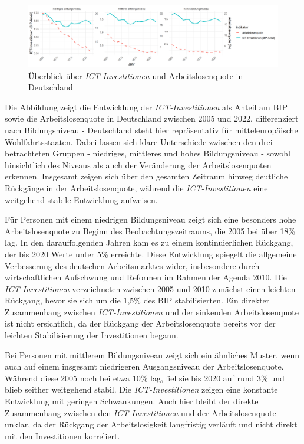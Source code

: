 \begin{figure}[htbp]
    \centering
    \includegraphics[width=\textwidth]{assets/plot_germany.png}
    \caption{Überblick über \textit{\ac{ICT}-Investitionen} und Arbeitslosenquote in 
    Deutschland}
    \label{fig:germany}
\end{figure}

Die Abbildung zeigt die Entwicklung der \textit{\ac{ICT}-Investitionen} als Anteil 
am BIP sowie die Arbeitslosenquote in Deutschland zwischen 2005 und 2022, 
differenziert nach Bildungsniveau - Deutschland steht hier repräsentativ für 
mitteleuropäische Wohlfahrtsstaaten. Dabei lassen sich klare Unterschiede zwischen 
den drei betrachteten Gruppen - niedriges, mittleres und hohes Bildungsniveau - sowohl 
hinsichtlich des Niveaus als auch der Veränderung der Arbeitslosenquoten erkennen. 
Insgesamt zeigen sich über den gesamten Zeitraum hinweg deutliche Rückgänge in der 
Arbeitslosenquote, während die \textit{\ac{ICT}-Investitionen} eine weitgehend 
stabile Entwicklung aufweisen.

Für Personen mit einem niedrigen Bildungsniveau zeigt sich eine besonders hohe 
Arbeitslosenquote zu Beginn des Beobachtungszeitraums, die 2005 bei über 18\% lag. 
In den darauffolgenden Jahren kam es zu einem kontinuierlichen Rückgang, der bis 2020 
Werte unter 5\% erreichte. Diese Entwicklung spiegelt die allgemeine Verbesserung des 
deutschen Arbeitsmarktes wider, insbesondere durch wirtschaftlichen Aufschwung und 
Reformen im Rahmen der Agenda 2010. Die \textit{\ac{ICT}-Investitionen} verzeichneten 
zwischen 2005 und 2010 zunächst einen leichten Rückgang, bevor sie sich um die 1,5\% 
des BIP stabilisierten. Ein direkter Zusammenhang zwischen 
\textit{\ac{ICT}-Investitionen} und der sinkenden Arbeitslosenquote ist nicht 
ersichtlich, da der Rückgang der Arbeitslosenquote bereits vor der leichten 
Stabilisierung der Investitionen begann.

Bei Personen mit mittlerem Bildungsniveau zeigt sich ein ähnliches Muster, wenn auch 
auf einem insgesamt niedrigeren Ausgangsniveau der Arbeitslosenquote. Während diese 
2005 noch bei etwa 10\% lag, fiel sie bis 2020 auf rund 3\% und blieb seither 
weitgehend stabil. Die \textit{\ac{ICT}-Investitionen} zeigen eine konstante 
Entwicklung mit geringen Schwankungen. Auch hier bleibt der direkte Zusammenhang 
zwischen den \textit{\ac{ICT}-Investitionen} und der Arbeitslosenquote unklar, da 
der Rückgang der Arbeitslosigkeit langfristig verläuft und nicht direkt mit den 
Investitionen korreliert.

